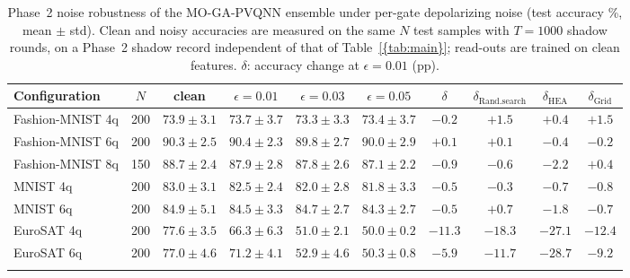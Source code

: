 \begin{table}[t]
\caption{Phase~2 noise robustness of the MO-GA-PVQNN ensemble under per-gate depolarizing noise (test accuracy \%, mean $\pm$ std). Clean and noisy accuracies are measured on the same $N$ test samples with $T=1000$ shadow rounds, on a Phase~2 shadow record independent of that of Table~\ref{{tab:main}}; read-outs are trained on clean features. $\delta$: accuracy change at $\epsilon=0.01$ (pp).}\label{tab:noise}
\scriptsize\setlength\tabcolsep{3pt}
\begin{tabular}{@{}lccccccccc@{}}
\toprule
Configuration & $N$ & clean & $\epsilon=0.01$ & $\epsilon=0.03$ & $\epsilon=0.05$ & $\delta$ & $\delta_\mathrm{Rand. search}$ & $\delta_\mathrm{HEA}$ & $\delta_\mathrm{Grid}$ \\
\midrule
Fashion-MNIST 4q & 200 & $73.9\pm3.1$ & $73.7\pm3.7$ & $73.3\pm3.3$ & $73.4\pm3.7$ & $-0.2$ & $+1.5$ & $+0.4$ & $+1.5$ \\
Fashion-MNIST 6q & 200 & $90.3\pm2.5$ & $90.4\pm2.3$ & $89.8\pm2.7$ & $90.0\pm2.9$ & $+0.1$ & $+0.1$ & $-0.4$ & $-0.2$ \\
Fashion-MNIST 8q & 150 & $88.7\pm2.4$ & $87.9\pm2.8$ & $87.8\pm2.6$ & $87.1\pm2.2$ & $-0.9$ & $-0.6$ & $-2.2$ & $+0.4$ \\
MNIST 4q & 200 & $83.0\pm3.1$ & $82.5\pm2.4$ & $82.0\pm2.8$ & $81.8\pm3.3$ & $-0.5$ & $-0.3$ & $-0.7$ & $-0.8$ \\
MNIST 6q & 200 & $84.9\pm5.1$ & $84.5\pm3.3$ & $84.7\pm2.7$ & $84.3\pm2.7$ & $-0.5$ & $+0.7$ & $-1.8$ & $-0.7$ \\
EuroSAT 4q & 200 & $77.6\pm3.5$ & $66.3\pm6.3$ & $51.0\pm2.1$ & $50.0\pm0.2$ & $-11.3$ & $-18.3$ & $-27.1$ & $-12.4$ \\
EuroSAT 6q & 200 & $77.0\pm4.6$ & $71.2\pm4.1$ & $52.9\pm4.6$ & $50.3\pm0.8$ & $-5.9$ & $-11.7$ & $-28.7$ & $-9.2$ \\
\botrule
\end{tabular}
\end{table}
